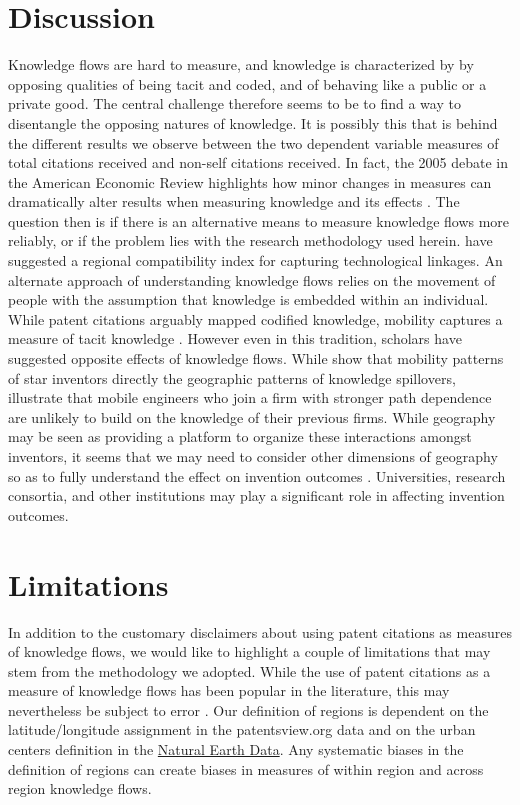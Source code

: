 \documentclass[12pt,letterpaper]{article}
\begin{document}
\section*{Discussion}
Knowledge flows are hard to measure, and knowledge is characterized by by opposing qualities of being tacit and coded, and of behaving like a public or a private good. The central challenge therefore seems to be to find a way to disentangle the opposing natures of knowledge. It is possibly this that is behind the different results we observe between the two dependent variable measures of total citations received and non-self citations received. In fact, the 2005 debate in the American Economic Review highlights how minor changes in measures can dramatically alter results when measuring knowledge and its effects \citep*{Henderson2005, Thompson2005}. The question then is if there is an alternative means to measure knowledge flows more reliably, or if the problem lies with the research methodology used herein. \cite{Maurseth2002} have suggested a regional compatibility index for capturing technological linkages. An alternate approach of understanding knowledge flows relies on the movement of people with the assumption that knowledge is embedded within an individual. While patent citations arguably mapped codified knowledge, mobility captures a measure of tacit knowledge \citep{Polanyi1958}. However even in this tradition, scholars have suggested opposite effects of knowledge flows. While \cite{Almeida1997} show that mobility patterns of star inventors directly the geographic patterns of knowledge spillovers, \cite{Song2003} illustrate that mobile engineers who join a firm with stronger path dependence are unlikely to build on the knowledge of their previous firms. While geography may be seen as providing a platform to organize these interactions amongst inventors, it seems that we may need to consider other dimensions of geography so as to fully understand the effect on invention outcomes \citep{Bunnell2001}. Universities, research consortia, and other institutions may play a significant role in affecting invention outcomes.

\section*{Limitations}
In addition to the customary disclaimers about using patent citations as measures of knowledge flows, we would like to highlight a couple of limitations that may stem from the methodology we adopted. While the use of patent citations as a measure of knowledge flows has been popular in the literature, this may nevertheless be subject to error \citep*{Arora2017a}. Our definition of regions is dependent on the latitude/longitude assignment in the patentsview.org data and on the urban centers definition in the \href{http://www.naturalearthdata.com/downloads/10m-cultural-vectors/}{Natural Earth Data}. Any systematic biases in the definition of regions can create biases in measures of within region and across region knowledge flows. \par
\end{document}
